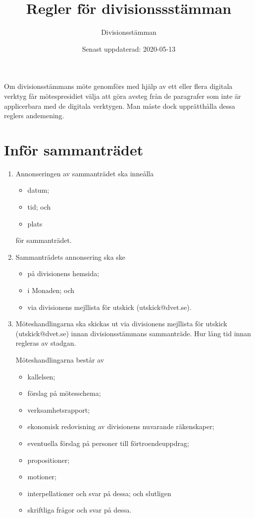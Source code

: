 \documentclass{dvd}
\begin{document}
	\title{Regler för divisionssstämman}
	\author{Divisionsstämman}
	\date{Senast uppdaterad: 2020-05-13}

	Om divisionsstämmans möte genomförs med hjälp av ett eller flera digitala verktyg får mötespresidiet välja att göra avsteg från de paragrafer som inte är applicerbara med de digitala verktygen.
	Man måste dock upprätthålla dessa reglers andemening.

	\section{Inför sammanträdet}

	\begin{enumerate}[label=\arabic* §, ref=\arabic*]
		\item Annonseringen av sammanträdet ska inneålla

		\begin{itemize}
			\item datum;
			\item tid; och
			\item plats
		\end{itemize}

		för sammanträdet.

		\item Sammanträdets annonsering ska ske

		\begin{itemize}
			\item på divisionens hemsida;
			\item i Monaden; och
			\item via divisionens mejllista för utskick (utskick@dvet.se).
		\end{itemize}

		\item Möteshandlingarna ska skickas ut via divisionens mejllista för utskick (utskick@dvet.se) innan divisionsstämmans sammanträde.
		Hur lång tid innan regleras av stadgan.

		Möteshandlingarna består av

		\begin{itemize}
			\item kallelsen;
			\item förslag på mötesschema;
			\item verksamhetsrapport;
			\item ekonomisk redovisning av divisionens nuvarande räkenskaper;
			\item eventuella förslag på personer till förtroendeuppdrag;
			\item propositioner;
			\item motioner;
			\item interpellationer och svar på dessa; och slutligen
			\item skriftliga frågor och svar på dessa.
		\end{itemize}


\end{enumerate}
\end{document}
